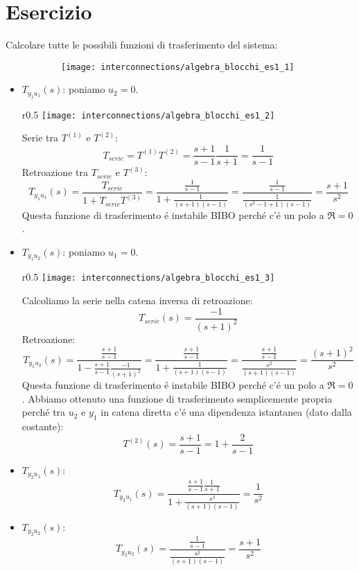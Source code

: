 \documentclass[../main.tex]{subfiles}
\begin{document}
	\section{Esercizio}
	Calcolare tutte le possibili funzioni di trasferimento del sistema:
	\begin{figure}[h!]
		\centering
		\begin{subfigure}{0.8\textwidth}
			\texttt{[image: interconnections/algebra\_blocchi\_es1\_1]}
		\end{subfigure}%
	\end{figure}
	\begin{itemize}
		\item $ T_{y_1 u_1}(s) $: poniamo $ u_2 = 0 $.\\
		\parbox[t]{\dimexpr\textwidth-\leftmargin}{%
			\vspace{-2.5mm}
			\begin{wrapfigure}{r}{0.5\textwidth}
				\centering
				\vspace{-\baselineskip}
				\texttt{[image: interconnections/algebra\_blocchi\_es1\_2]}
			\end{wrapfigure}
			Serie tra $ T^{(1)} $ e $ T^{(2)} $:
			\[ T_{serie} = T^{(1)} T^{(2)} = \frac{s+1}{s-1} \frac{1}{s+1} = \frac{1}{s-1} \]
			Retroazione tra $ T_{serie} $ e $ T^{(3)} $:
			\[ T_{y_1 u_1}(s) = \frac{T_{serie}}{1+T_{serie} T^{(3)}} = \frac{\frac{1}{s-1}}{1+\frac{1}{(s+1)(s-1)}} = \frac{\frac{1}{s-1}}{\frac{1}{(s^2-1+1)(s-1)}} = \frac{s+1}{s^2} \]
			Questa funzione di trasferimento \'e instabile BIBO perch\'e c'\'e un polo a $ \Re = 0 $.
		}
		\item $ T_{y_1 u_2}(s) $: poniamo $ u_1 = 0 $.\\
		\parbox[t]{\dimexpr\textwidth-\leftmargin}{%
			\vspace{-2.5mm}
			\begin{wrapfigure}[10]{r}{0.5\textwidth}
				\centering
				\vspace{-\baselineskip}
				\texttt{[image: interconnections/algebra\_blocchi\_es1\_3]}
			\end{wrapfigure}
			Calcoliamo la serie nella catena inversa di retroazione:
			\[ T_{serie}(s) = \frac{-1}{(s+1)^2} \]
			Retroazione:
			\[ T_{y_1 u_2}(s) = \frac{\frac{s+1}{s-1}}{1-\frac{s+1}{s-1}\frac{-1}{(s+1)^2}} = \frac{\frac{s+1}{s-1}}{1+\frac{1}{(s+1)(s-1)}} = \frac{\frac{s+1}{s-1}}{\frac{s^2}{(s+1)(s-1)}} = \frac{(s+1)^2}{s^2} \]
			Questa funzione di trasferimento \'e instabile BIBO perch\'e c'\'e un polo a $ \Re = 0 $.
			Abbiamo ottenuto una funzione di trasferimento semplicemente propria perch\'e tra $ u_2 $ e $ y_1 $ in catena diretta c'\'e una dipendenza istantanea (dato dalla costante):
			\[ T^{(2)}(s) = \frac{s+1}{s-1} = 1 + \frac{2}{s-1} \]
		}
		\item $ T_{y_2 u_1}(s) $:
		\[ T_{y_2 u_1}(s) = \frac{\frac{s+1}{s-1}\frac{1}{s+1}}{1+\frac{s^2}{(s+1)(s-1)}} = \frac{1}{s^2} \]
		\item $ T_{y_2 u_2}(s) $:
		\[ T_{y_2 u_2}(s) = \frac{\frac{1}{s-1}}{\frac{s^2}{(s+1)(s-1)}} = \frac{s+1}{s^2}\]
	\end{itemize}
\end{document}
